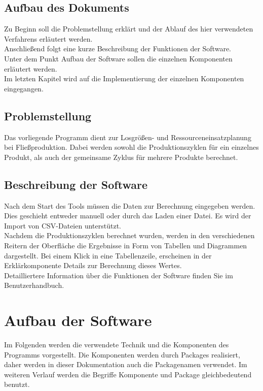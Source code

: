 \documentclass[12pt,a4paper, listof=entryprefix, bibliography=totocnumbered,toc=listofnumbered,lof=listofnumbered]{scrartcl}
\begin{document}
\subsection{Aufbau des Dokuments}
Zu Beginn soll die Problemstellung erklärt und der Ablauf des hier verwendeten Verfahrens erläutert werden.
\\
Anschließend folgt eine kurze Beschreibung der Funktionen der Software.
\\
Unter dem Punkt Aufbau der Software sollen die einzelnen Komponenten erläutert werden.
\\
Im letzten Kapitel wird auf die Implementierung der einzelnen Komponenten eingegangen.
\subsection{Problemstellung}
Das vorliegende Programm dient zur Losgrößen- und Ressourceneinsatzplanung bei Fließproduktion. Dabei werden sowohl die Produktionszyklen für ein einzelnes Produkt, als auch der gemeinsame Zyklus für mehrere Produkte berechnet.
\subsection{Beschreibung der Software}
Nach dem Start des Tools müssen die Daten zur Berechnung eingegeben werden. Dies geschieht entweder manuell oder durch das Laden einer Datei. Es wird der Import von \gls{CSV}-Dateien unterstützt.
\\
Nachdem die Produktionszyklen berechnet wurden, werden in den verschiedenen Reitern der Oberfläche die Ergebnisse in Form von Tabellen und Diagrammen dargestellt. Bei einem Klick in eine Tabellenzeile, erscheinen in der Erklärkomponente Details zur Berechnung dieses Wertes.
\\
Detailliertere Information über die Funktionen der Software finden Sie im Benutzerhandbuch.



\section{Aufbau der Software}
Im Folgenden werden die verwendete Technik und die Komponenten des Programms vorgestellt. Die Komponenten werden durch Packages realisiert, daher werden in dieser Dokumentation auch die Packagenamen verwendet. Im weiteren Verlauf werden die Begriffe Komponente und Package gleichbedeutend benutzt.
\end{document}
